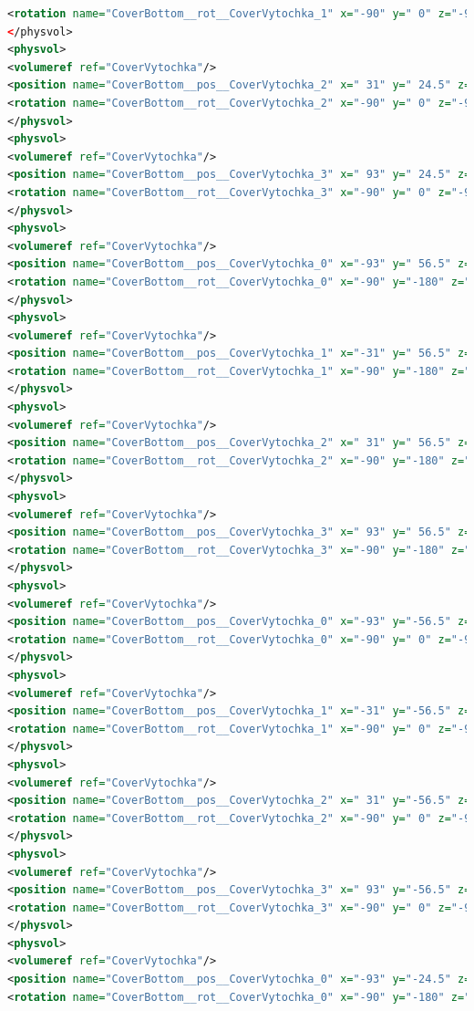 \begin{lstlisting}[language=XML, firstline=1, lastline=89]
<rotation name="CoverBottom__rot__CoverVytochka_1" x="-90" y=" 0" z="-90" unit="deg"/>
</physvol>
<physvol>
<volumeref ref="CoverVytochka"/>
<position name="CoverBottom__pos__CoverVytochka_2" x=" 31" y=" 24.5" z=" 1" unit="mm"/>
<rotation name="CoverBottom__rot__CoverVytochka_2" x="-90" y=" 0" z="-90" unit="deg"/>
</physvol>
<physvol>
<volumeref ref="CoverVytochka"/>
<position name="CoverBottom__pos__CoverVytochka_3" x=" 93" y=" 24.5" z=" 1" unit="mm"/>
<rotation name="CoverBottom__rot__CoverVytochka_3" x="-90" y=" 0" z="-90" unit="deg"/>
</physvol>
<physvol>
<volumeref ref="CoverVytochka"/>
<position name="CoverBottom__pos__CoverVytochka_0" x="-93" y=" 56.5" z=" 1" unit="mm"/>
<rotation name="CoverBottom__rot__CoverVytochka_0" x="-90" y="-180" z="-90" unit="deg"/>
</physvol>
<physvol>
<volumeref ref="CoverVytochka"/>
<position name="CoverBottom__pos__CoverVytochka_1" x="-31" y=" 56.5" z=" 1" unit="mm"/>
<rotation name="CoverBottom__rot__CoverVytochka_1" x="-90" y="-180" z="-90" unit="deg"/>
</physvol>
<physvol>
<volumeref ref="CoverVytochka"/>
<position name="CoverBottom__pos__CoverVytochka_2" x=" 31" y=" 56.5" z=" 1" unit="mm"/>
<rotation name="CoverBottom__rot__CoverVytochka_2" x="-90" y="-180" z="-90" unit="deg"/>
</physvol>
<physvol>
<volumeref ref="CoverVytochka"/>
<position name="CoverBottom__pos__CoverVytochka_3" x=" 93" y=" 56.5" z=" 1" unit="mm"/>
<rotation name="CoverBottom__rot__CoverVytochka_3" x="-90" y="-180" z="-90" unit="deg"/>
</physvol>
<physvol>
<volumeref ref="CoverVytochka"/>
<position name="CoverBottom__pos__CoverVytochka_0" x="-93" y="-56.5" z=" 1" unit="mm"/>
<rotation name="CoverBottom__rot__CoverVytochka_0" x="-90" y=" 0" z="-90" unit="deg"/>
</physvol>
<physvol>
<volumeref ref="CoverVytochka"/>
<position name="CoverBottom__pos__CoverVytochka_1" x="-31" y="-56.5" z=" 1" unit="mm"/>
<rotation name="CoverBottom__rot__CoverVytochka_1" x="-90" y=" 0" z="-90" unit="deg"/>
</physvol>
<physvol>
<volumeref ref="CoverVytochka"/>
<position name="CoverBottom__pos__CoverVytochka_2" x=" 31" y="-56.5" z=" 1" unit="mm"/>
<rotation name="CoverBottom__rot__CoverVytochka_2" x="-90" y=" 0" z="-90" unit="deg"/>
</physvol>
<physvol>
<volumeref ref="CoverVytochka"/>
<position name="CoverBottom__pos__CoverVytochka_3" x=" 93" y="-56.5" z=" 1" unit="mm"/>
<rotation name="CoverBottom__rot__CoverVytochka_3" x="-90" y=" 0" z="-90" unit="deg"/>
</physvol>
<physvol>
<volumeref ref="CoverVytochka"/>
<position name="CoverBottom__pos__CoverVytochka_0" x="-93" y="-24.5" z=" 1" unit="mm"/>
<rotation name="CoverBottom__rot__CoverVytochka_0" x="-90" y="-180" z="-90" unit="deg"/>

\end{lstlisting}
